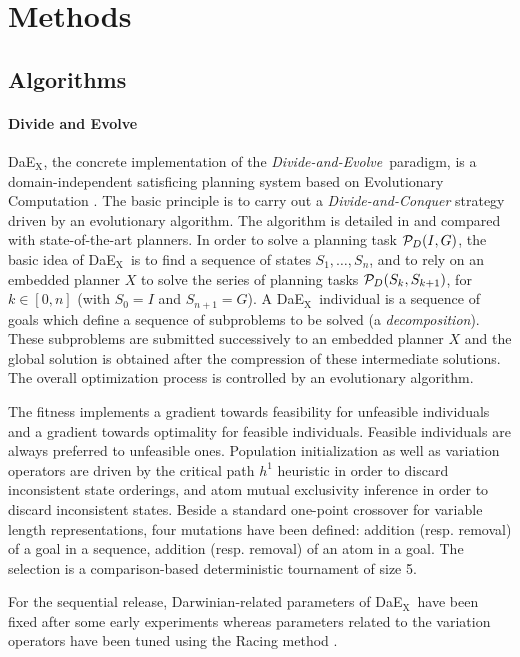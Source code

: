 \documentclass{sig-alternate}
\newcommand{\dae}{{\em Divide-and-Evolve}}
\newcommand{\DAEX}{{\sc DaE$_{\text{X}}$}}
\begin{document}
\section{Methods}

\subsection{Algorithms}

\paragraph{Divide and Evolve}
\DAEX, the concrete implementation of the \dae\ paradigm, is a
domain-independent satisficing planning system based on Evolutionary Computation
\cite{dae:evocop2006}. The basic principle is to carry out a {\em
Divide-and-Conquer} strategy driven by an evolutionary algorithm. The algorithm
is detailed in \cite{dae:icaps2010} and compared with state-of-the-art planners.
In order to solve a planning task ${\cal P}_D(I,G)$, the basic idea of \DAEX\ is
to find a sequence of states $S_1, \ldots, S_n$, and to rely on an embedded
planner $X$ to solve the series of planning tasks ${\cal P}_D(S_{k},S_{k+1})$,
for $k \in [0,n]$ (with $S_0 = I$ and $S_{n+1} = G$). A \DAEX\ individual is a
sequence of goals which define a sequence of subproblems to be solved (a {\it
decomposition}). These subproblems are submitted successively to an embedded
planner $X$ and the global solution is obtained after the compression of these
intermediate solutions. The overall optimization process is controlled by
an evolutionary algorithm.

The fitness implements a gradient towards feasibility for unfeasible individuals
and a gradient towards optimality for feasible individuals. Feasible individuals
are always preferred to unfeasible ones. Population initialization as well as
variation operators are driven by the critical path $h^1$ heuristic
\cite{h1:aips2000} in order to discard inconsistent state orderings, and atom
mutual exclusivity inference in order to discard inconsistent states. Beside a
standard one-point crossover for variable length representations, four mutations
have been defined: addition (resp. removal) of a goal in a sequence, addition
(resp. removal) of an atom in a goal. The selection is a comparison-based
deterministic tournament of size 5.

For the sequential release, Darwinian-related parameters of \DAEX\ have been
fixed after some early experiments \cite{dae:evocop2006} whereas parameters
related to the variation operators have been tuned using the Racing method \cite{dae:gecco2010}.
\end{document}
